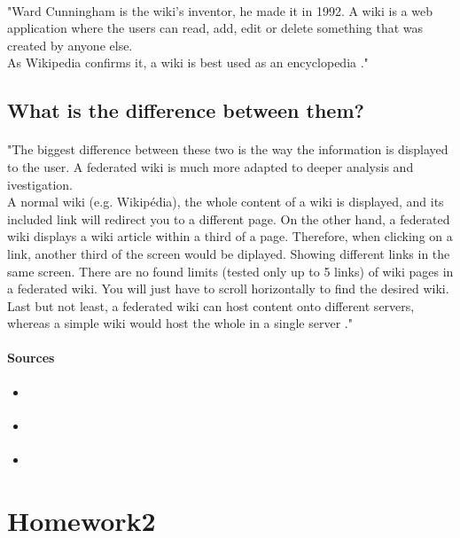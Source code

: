 \documentclass[10pt,a4paper]{article}
\begin{document}
\paragraph{}"Ward Cunningham is the wiki's inventor, he made it in 1992.
A wiki is a web application where the users can read, add, edit or delete something that was created by anyone else.\\
As Wikipedia confirms it, a wiki is best used as an encyclopedia \cite{floref3}."\cite{floref1}

\subsection{What is the difference between them?}
\paragraph{}"The biggest difference between these two is the way the information is displayed to the user. A federated wiki is much more adapted to deeper analysis and ivestigation.\\
A normal wiki (e.g. Wikipédia), the whole content of a wiki is displayed, and its included link will redirect you to a different page. On the other hand, a federated wiki displays a wiki article within a third of a page. Therefore, when clicking on a link, another third of the screen would be diplayed. Showing different links in the same screen. There are no found limits (tested only up to 5 links) of wiki pages in a federated wiki. You will just have to scroll horizontally to find the desired wiki.\\
Last but not least, a federated wiki can host content onto different servers, whereas a simple wiki would host the whole in a single server \cite{floref1}\cite{floref3}."\cite{floref1}

\paragraph{Sources}
\begin{itemize}
\item \cite{floref1}
\item \cite{floref2} 
\item \cite{floref3}
\end{itemize}


\newpage
\section{Homework2}
\end{document}
